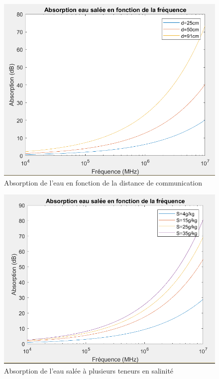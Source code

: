 \documentclass{article}
\begin{document}
\begin{figure}[H]
    \caption{Absorption de l'eau en fonction de la distance de communication}
    \includegraphics[scale=0.6]{images/distance.PNG}
    \centering
\end{figure}
\begin{figure}[H]
    \caption{Absorption de l'eau salée à plusieurs teneurs en salinité}
    \includegraphics[scale=0.6]{images/sal.PNG}
    \centering
\end{figure}
\end{document}
